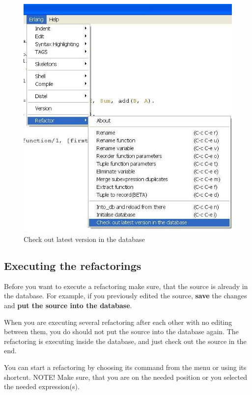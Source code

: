 \documentclass[12pt]{article}
\begin{document}
\begin{center}
\begin{figure}[htbp]

    \includegraphics[scale=0.80]{checkout.jpg}
   \caption{Check out latest version in the database}
  \label{cho}
\end{figure}
\end{center}

\subsection{Executing the refactorings}

Before you want to execute a refactoring make sure, that the source is already in the database.
For example, if you previously edited the source, {\bf save} the changes and {\bf put the source into the database}.

When you are executing several refactoring after each other with no editing between them, 
you do should not put the source into the database again. 
The refactoring is executing inside the database, and just check out the source in the end.

You can start a refactoring by choosing its command from the menu or using its shortcut.
NOTE! Make sure, that you are on the needed position or you selected the needed expression(s).
\end{document}
